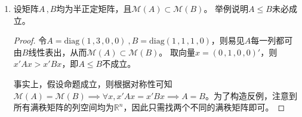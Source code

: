 \documentclass[10pt]{article}
\theoremstyle{definition}
\theoremstyle{definition}
\begin{document}
\begin{enumerate}
\begin{proof}
\begin{enumerate}[label=(\roman*)]
\begin{equation*}
\begin{aligned}
                             & \quad \Rightarrow (A^{\frac{1}{2}}x)'(A^{\frac{1}{2}}x)=0 \\
                             & \quad \Rightarrow (A^{\frac{1}{2}}x)=0 \\
                             & \quad \Rightarrow Ax=0 \\
                             & \quad \Rightarrow \mathcal{M}(B)^{\perp} \subset \mathcal{M}(A)^{\perp} \\
                    \end{aligned}
                \end{equation*}
                从而$\mathcal{M}(A)\subset \mathcal{M}(B)$。
            \item
                对$\forall \xi \in \mathbb{R}^m$，存在$\xi_1\in \mathcal{M}(A)$和$\xi_2\in \mathcal{M}(A)^{\perp}$使得$\xi=\xi_1+\xi_2$。
                从而
                \begin{equation*}
                    \xi' P_A\xi= \xi' P_AP_A\xi=(P_A\xi)'(P_A\xi)=\xi_1'\xi_1
                \end{equation*}
                于是
                \begin{equation*}
                    \begin{aligned}
                        \xi'P_B\xi & = \xi_1'P_B\xi_1 + \xi_1'P_B\xi_2 +\xi_2'P_B\xi_1 + \xi_2'P_B\xi_2 \\
                                   & = (P_B\xi)'(P_B\xi) + (P_B\xi_1)'\xi_2 + \xi_2'(P_B\xi_1) + \xi_2'P_B\xi_2 \\
                                   & = \xi_1'\xi_1 + \xi_1‘’\xi_2 + \xi_2'\xi_1 + \xi_2'P_B\xi_2 \\
                                   & = \xi_1'\xi_1 + \xi_2'P_B\xi_2 \\
                                   & \ge \xi_1'\xi_1 =\xi' P_A\xi
                    \end{aligned}
                \end{equation*}
                从而$P_A \le P_B$。
        \end{enumerate}
    \end{proof}

\item	%
    设矩阵$A\, ,B$均为半正定矩阵，且$\mathcal{M}(A)\subset \mathcal{M}(B)$。
    举例说明$A\le B$未必成立。

    \begin{proof}
        令$A=\mathrm{diag}(1\, ,3\, ,0\, ,0)\ ,B=\mathrm{diag}(1\, ,1\, ,1\, ,0)$，则易见$A$每一列都可由$B$线性表出，从而$\mathcal{M}(A)\subset \mathcal{M}(B)$。
        取向量$x=(0\, ,1\, ,0\, ,0)'$，则$x'Ax>x'Bx$，即$A\le B$不成立。

        事实上，假设命题成立，则根据对称性可知$\mathcal{M}(A) = \mathcal{M}(B) \implies \forall x, x'Ax = x'Bx \implies A = B$。为了构造反例，注意到所有满秩矩阵的列空间均为$\mathbb{R}^n$，因此只需找两个不同的满秩矩阵即可。
    \end{proof}
\end{enumerate}
\end{document}
